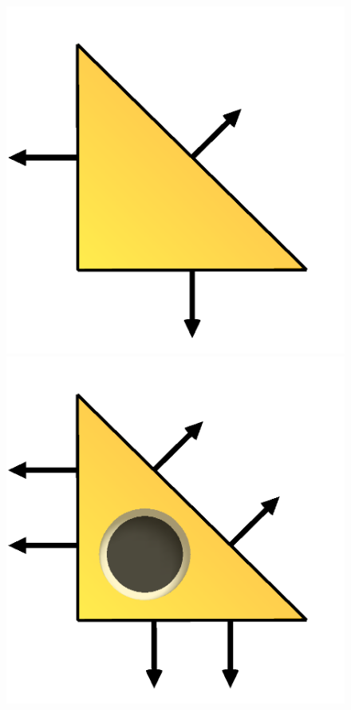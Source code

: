 \begin{figure}
  \centering
  \includegraphics[width=\threefigs]{chapters/kirby-6/png/RT1_2d.png}
  \includegraphics[width=\threefigs]{chapters/kirby-6/png/RT2_2d.png}

\end{figure}
